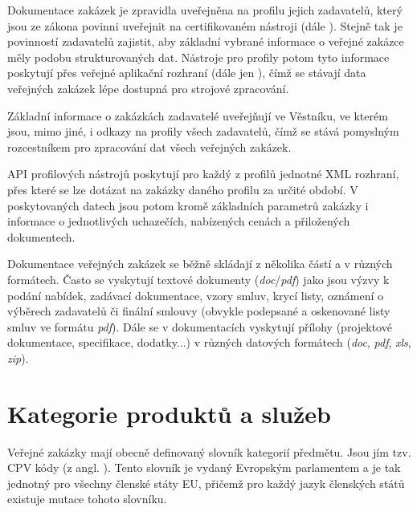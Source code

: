 \documentclass[thesis=M,czech]{FITthesis}[2019/12/23]
\begin{document}
Dokumentace zakázek je zpravidla uveřejněna na profilu jejich zadavatelů, který jsou ze zákona povinni uveřejnit na certifikovaném nástroji (dále )\cite{vhodneuverejneniFAQ}. Stejně tak je povinností zadavatelů zajistit, aby základní vybrané informace o veřejné zakázce měly podobu strukturovaných dat\cite{isvz2}. Nástroje pro profily potom tyto informace poskytují přes veřejné aplikační rozhraní (dále jen ), čímž se stávají data veřejných zakázek lépe dostupná pro strojové zpracování.

Základní informace o zakázkách zadavatelé uveřejňují ve Věstníku, ve kterém jsou, mimo jiné, i odkazy na profily všech zadavatelů, čímž se stává pomyslným rozcestníkem pro zpracování dat všech veřejných zakázek.

API profilových nástrojů poskytují pro každý z profilů jednotné XML rozhraní, přes které se lze dotázat na zakázky daného profilu za určité období. V poskytovaných datech jsou potom kromě základních parametrů zakázky i informace o jednotlivých uchazečích, nabízených cenách a přiložených dokumentech.

Dokumentace veřejných zakázek se běžně skládají z několika částí a v různých formátech. Často se vyskytují textové dokumenty (\textit{doc}/\textit{pdf}) jako jsou výzvy k podání nabídek, zadávací dokumentace, vzory smluv, krycí listy, oznámení o výběrech zadavatelů či finální smlouvy (obvykle podepsané a oskenované listy smluv ve formátu \textit{pdf}). Dále se v dokumentacích vyskytují přílohy (projektové dokumentace, specifikace, dodatky...) v různých datových formátech (\textit{doc}, \textit{pdf}, \textit{xls}, \textit{zip}).

\section{Kategorie produktů a služeb}

Veřejné zakázky mají obecně definovaný slovník kategorií předmětu. Jsou jím tzv. CPV kódy (z angl. ). Tento slovník je vydaný Evropským parlamentem a je tak jednotný pro všechny členské státy EU, přičemž pro každý jazyk členských států existuje mutace tohoto slovníku.
\end{document}
